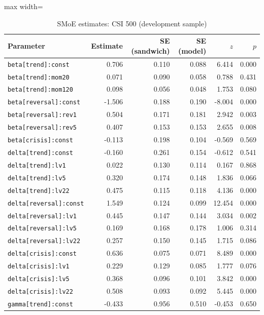 \begin{table}[!htbp]\centering\scriptsize
\caption{SMoE estimates: CSI 500 (development sample)}\label{tab:params_csi500}
\begin{adjustbox}{max width=\textwidth}
\begin{tabular}{lrrrrr}
\toprule
Parameter & Estimate & SE (sandwich) & SE (model) & $z$ & $p$\\
\midrule
\texttt{beta[trend]:const} & 0.706 & 0.110 & 0.088 & 6.414 & 0.000\\
\texttt{beta[trend]:mom20} & 0.071 & 0.090 & 0.058 & 0.788 & 0.431\\
\texttt{beta[trend]:mom120} & 0.098 & 0.056 & 0.048 & 1.753 & 0.080\\
\texttt{beta[reversal]:const} & -1.506 & 0.188 & 0.190 & -8.004 & 0.000\\
\texttt{beta[reversal]:rev1} & 0.504 & 0.171 & 0.181 & 2.942 & 0.003\\
\texttt{beta[reversal]:rev5} & 0.407 & 0.153 & 0.153 & 2.655 & 0.008\\
\texttt{beta[crisis]:const} & -0.113 & 0.198 & 0.104 & -0.569 & 0.569\\
\texttt{delta[trend]:const} & -0.160 & 0.261 & 0.154 & -0.612 & 0.541\\
\texttt{delta[trend]:lv1} & 0.022 & 0.130 & 0.114 & 0.167 & 0.868\\
\texttt{delta[trend]:lv5} & 0.320 & 0.174 & 0.148 & 1.836 & 0.066\\
\texttt{delta[trend]:lv22} & 0.475 & 0.115 & 0.118 & 4.136 & 0.000\\
\texttt{delta[reversal]:const} & 1.549 & 0.124 & 0.099 & 12.454 & 0.000\\
\texttt{delta[reversal]:lv1} & 0.445 & 0.147 & 0.144 & 3.034 & 0.002\\
\texttt{delta[reversal]:lv5} & 0.169 & 0.168 & 0.178 & 1.006 & 0.314\\
\texttt{delta[reversal]:lv22} & 0.257 & 0.150 & 0.145 & 1.715 & 0.086\\
\texttt{delta[crisis]:const} & 0.636 & 0.075 & 0.071 & 8.489 & 0.000\\
\texttt{delta[crisis]:lv1} & 0.229 & 0.129 & 0.085 & 1.777 & 0.076\\
\texttt{delta[crisis]:lv5} & 0.368 & 0.096 & 0.101 & 3.842 & 0.000\\
\texttt{delta[crisis]:lv22} & 0.508 & 0.093 & 0.092 & 5.445 & 0.000\\
\texttt{gamma[trend]:const} & -0.433 & 0.956 & 0.510 & -0.453 & 0.650\\

\end{tabular}
\end{adjustbox}
\end{table}
